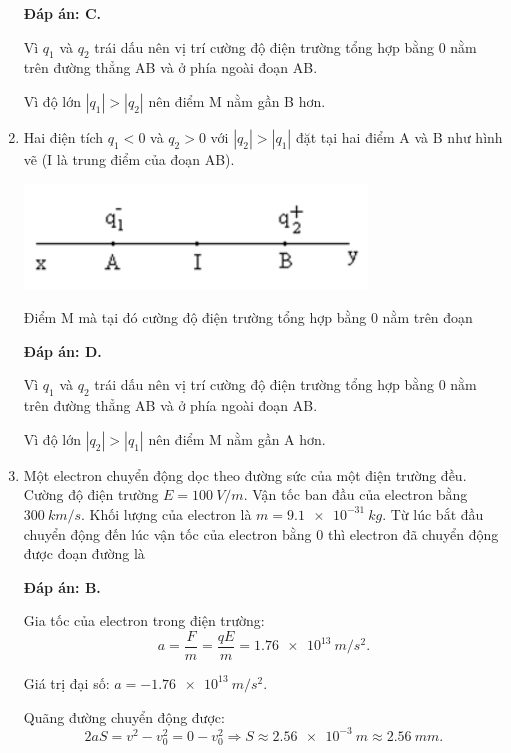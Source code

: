 \begin{enumerate}[label=\bfseries Câu \arabic*:]
{	}
	\loigiai
	{	\textbf{Đáp án: C.}
		
		Vì $q_1$ và $q_2$ trái dấu nên vị trí cường độ điện trường tổng hợp bằng 0 nằm trên đường thẳng AB và ở phía ngoài đoạn AB.
		
		Vì độ lớn $|q_1| > |q_2|$ nên điểm M nằm gần B hơn.
	}
	\item {}
	
	\cauhoi
	{Hai điện tích $q_1<0$ và $q_2>0$ với $|q_2| > |q_1|$ đặt tại hai điểm A và B như hình vẽ (I là trung điểm của đoạn AB).
		\begin{center}
			\includegraphics{../figs/VN11-2021-PH-TP004-1}
		\end{center}
	Điểm M mà tại đó cường độ điện trường tổng hợp bằng 0 nằm trên đoạn
		
	}
	\loigiai
	{	\textbf{Đáp án: D.}
		
		Vì $q_1$ và $q_2$ trái dấu nên vị trí cường độ điện trường tổng hợp bằng 0 nằm trên đường thẳng AB và ở phía ngoài đoạn AB.
		
		Vì độ lớn $|q_2| > |q_1|$ nên điểm M nằm gần A hơn.
	}
	\item {}
	
	\cauhoi
	{Một electron chuyển động dọc theo đường sức của một điện trường đều. Cường độ điện trường $E=\SI{100}{V/m}$. Vận tốc ban đầu của electron bằng $\SI{300}{km/s}$. Khối lượng của electron là $m=\SI{9.1e-31}{kg}$. Từ lúc bắt đầu chuyển động đến lúc vận tốc của electron bằng 0 thì electron đã chuyển động được đoạn đường là
		
	}
	\loigiai
	{	\textbf{Đáp án: B.}
		
		Gia tốc của electron trong điện trường:
		$$a=\dfrac{F}{m} = \dfrac{qE}{m} = \SI{1.76e13}{m/s^2}.$$
		
		Giá trị đại số: $a=\SI{-1.76e13}{m/s^2}$.
		
		Quãng đường chuyển động được:
		$$2aS = v^2 - v_0^2 = 0 - v_0^2 \Rightarrow S \approx \SI{2.56e-3}{m} \approx \SI{2.56}{mm}.$$
	}
\end{enumerate}

